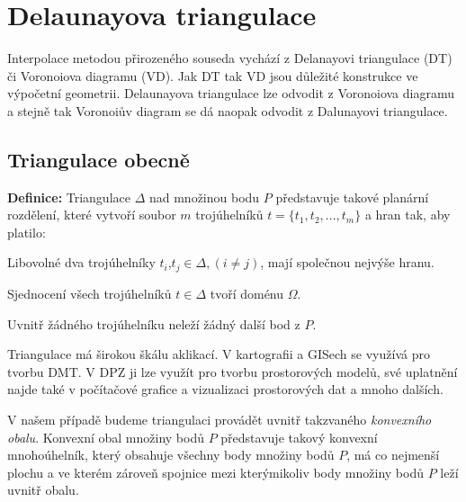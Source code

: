 \documentclass[12pt,a4paper]{article}
\begin{document}
\newpage
\section{Delaunayova triangulace}

Interpolace metodou přirozeného souseda vychází z Delanayovi
triangulace (DT) či Voronoiova diagramu (VD). Jak DT tak VD jsou důležité
konstrukce ve výpočetní geometrii. Delaunayova triangulace lze odvodit
z Voronoiova diagramu a stejně tak Voronoiův diagram se dá naopak
odvodit z Dalunayovi triangulace.

\subsection{Triangulace obecně}
\textbf{Definice\cite{TB1}:} Triangulace $\Delta$ nad množinou bodu
$P$ představuje takové planární rozdělení, které vytvoří soubor $m$
trojúhelníků $t = \{ t_1, t_2,...,t_m \}$ a hran tak, aby platilo:

Libovolné dva trojúhelníky $t_i$,$t_j \in \Delta, (i \neq j)$, mají
společnou nejvýše hranu.

Sjednocení všech trojúhelníků $t \in \Delta$ tvoří doménu $\Omega$.

Uvnitř žádného trojúhelníku neleží žádný další bod z $P$.

\bigskip

Triangulace má širokou škálu aklikací. V kartografii a GISech se
využívá pro tvorbu DMT. V DPZ ji lze využít pro tvorbu prostorových
modelů, své uplatnění najde také v počítačové grafice a vizualizaci
prostorových dat a mnoho dalších.

V našem případě budeme triangulaci provádět uvnitř takzvaného
\emph{konvexního obalu}. Konvexní obal množiny bodů $P$ představuje
takový konvexní mnohoúhelník, který obsahuje všechny body množiny bodů
$P$, má co nejmenší plochu a ve kterém zároveň spojnice mezi
kterýmikoliv body množiny bodů $P$ leží uvnitř obalu.
\end{document}
